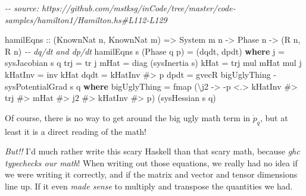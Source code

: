 \documentclass[]{article}
\newenvironment{Shaded}{}{}
\newcommand{\CommentTok}[1]{\textcolor[rgb]{0.38,0.63,0.69}{\textit{#1}}}
\newcommand{\DataTypeTok}[1]{\textcolor[rgb]{0.56,0.13,0.00}{#1}}
\newcommand{\FunctionTok}[1]{\textcolor[rgb]{0.02,0.16,0.49}{#1}}
\newcommand{\KeywordTok}[1]{\textcolor[rgb]{0.00,0.44,0.13}{\textbf{#1}}}
\newcommand{\NormalTok}[1]{#1}
\newcommand{\OperatorTok}[1]{\textcolor[rgb]{0.40,0.40,0.40}{#1}}
\newcommand{\OtherTok}[1]{\textcolor[rgb]{0.00,0.44,0.13}{#1}}
\begin{document}
\begin{Shaded}
\begin{Highlighting}[]
\CommentTok{{-}{-} source: https://github.com/mstksg/inCode/tree/master/code{-}samples/hamilton1/Hamilton.hs\#L112{-}L129}

\NormalTok{hamilEqns}
\OtherTok{    ::}\NormalTok{ (}\DataTypeTok{KnownNat}\NormalTok{ n, }\DataTypeTok{KnownNat}\NormalTok{ m)}
    \OtherTok{=\textgreater{}} \DataTypeTok{System}\NormalTok{ m n}
    \OtherTok{{-}\textgreater{}} \DataTypeTok{Phase}\NormalTok{ n}
    \OtherTok{{-}\textgreater{}}\NormalTok{ (}\DataTypeTok{R}\NormalTok{ n, }\DataTypeTok{R}\NormalTok{ n)       }\CommentTok{{-}{-} dq/dt and dp/dt}
\NormalTok{hamilEqns s (}\DataTypeTok{Phase}\NormalTok{ q p) }\OtherTok{=}\NormalTok{ (dqdt, dpdt)}
  \KeywordTok{where}
\NormalTok{    j       }\OtherTok{=}\NormalTok{ sysJacobian s q}
\NormalTok{    trj     }\OtherTok{=}\NormalTok{ tr j}
\NormalTok{    mHat    }\OtherTok{=}\NormalTok{ diag (sysInertia s)}
\NormalTok{    kHat    }\OtherTok{=}\NormalTok{ trj }\OtherTok{\textasciigrave{}mul\textasciigrave{}}\NormalTok{ mHat }\OtherTok{\textasciigrave{}mul\textasciigrave{}}\NormalTok{ j}
\NormalTok{    kHatInv }\OtherTok{=}\NormalTok{ inv kHat}
\NormalTok{    dqdt    }\OtherTok{=}\NormalTok{ kHatInv }\OperatorTok{\#\textgreater{}}\NormalTok{ p}
\NormalTok{    dpdt    }\OtherTok{=}\NormalTok{ gvecR bigUglyThing }\OperatorTok{{-}}\NormalTok{ sysPotentialGrad s q}
      \KeywordTok{where}
\NormalTok{        bigUglyThing }\OtherTok{=}
          \FunctionTok{fmap}\NormalTok{ (\textbackslash{}j2 }\OtherTok{{-}\textgreater{}} \OperatorTok{{-}}\NormalTok{p }\OperatorTok{\textless{}.\textgreater{}}\NormalTok{ kHatInv }\OperatorTok{\#\textgreater{}}\NormalTok{ trj }\OperatorTok{\#\textgreater{}}\NormalTok{ mHat }\OperatorTok{\#\textgreater{}}\NormalTok{ j2 }\OperatorTok{\#\textgreater{}}\NormalTok{ kHatInv }\OperatorTok{\#\textgreater{}}\NormalTok{ p)}
\NormalTok{               (sysHessian s q)}
\end{Highlighting}
\end{Shaded}

Of course, there is no way to get around the big ugly math term in
\(\dot{p}_q\), but at least it is a direct reading of the math!

\emph{But!!} I'd much rather write this scary Haskell than that scary math,
because \emph{ghc typechecks our math}! When writing out those equations, we
really had no idea if we were writing it correctly, and if the matrix and vector
and tensor dimensions line up. If it even \emph{made sense} to multiply and
transpose the quantities we had.
\end{document}
